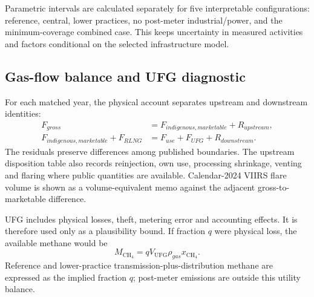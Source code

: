 Parametric intervals are calculated separately for five interpretable configurations:
reference, central, lower practices, no post-meter industrial/power, and the
minimum-coverage combined
case. This keeps uncertainty in measured activities and factors conditional on the selected
infrastructure model.

\subsection{Gas-flow balance and UFG diagnostic}

For each matched year, the physical account separates upstream and downstream identities:
\begin{align}
F_{gross}&=F_{indigenous,marketable}+R_{upstream},\\
F_{indigenous,marketable}+F_{RLNG}&=F_{use}+F_{UFG}+R_{downstream}.
\end{align}
The residuals preserve differences among published boundaries. The upstream disposition table
also records reinjection, own use, processing shrinkage, venting and flaring where public
quantities are available. Calendar-2024 VIIRS flare volume is shown as a volume-equivalent memo
against the adjacent gross-to-marketable difference.

UFG includes physical losses, theft, metering error and accounting effects. It is therefore used
only as a plausibility bound. If fraction $q$ were physical loss, the available methane would be
\begin{equation}
M_{\mathrm{CH_4}}=q V_{\mathrm{UFG}}\rho_{gas}x_{\mathrm{CH_4}}.
\end{equation}
Reference and lower-practice transmission-plus-distribution methane are expressed as the implied
fraction $q$; post-meter emissions are outside this utility balance.

